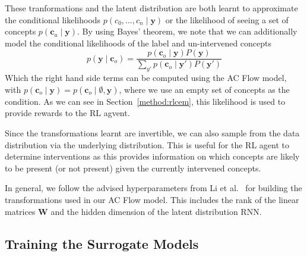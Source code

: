 These tranformations and the latent distribution are both learnt to
approximate the conditional likelihoods $p(c_0, \ldots, c_n \mid \mathbf{y})$
or the likelihood of seeing a set of concepts $p(\mathbf{c}_u \mid \mathbf{y})$.
By using Bayes' theorem, we note that
we can additionally model the conditional likelihoods of the label and un-intervened
concepts
\begin{equation}\label{equation:bayes}
p(\mathbf{y} \mid \mathbf{c}_o ) = \frac{
p( \mathbf{c}_o \mid \mathbf{y}) P(\mathbf{y})}
{\sum_{y'} p( \mathbf{c}_o \mid \mathbf{y}')P(\mathbf{y}')}
\end{equation}
Which the right hand side terms can be computed using the AC Flow model, with
$p(\mathbf{c}_o \mid \mathbf{y}) = p(\mathbf{c}_o \mid \emptyset, \mathbf{y})$, where we 
use an empty set of concepts as the condition.
As we can see in Section~\ref{method:rlcem}, this likelihood is used to 
provide rewards to the RL agvent.

Since the transformations learnt are invertible,
we can also sample from the data distribution
via the underlying distribution.
This is useful for the RL agent to
determine interventions as
this provides information on which concepts are likely to be present 
(or not present) given the currently intervened
concepts.

In general, we follow the advised hyperparameters from Li et al.~\cite{acflow}
for building the transformations used in our AC Flow model. This includes the rank of the linear
matrices $\mathbf{W}$ and the hidden dimension of the latent distribution RNN. 

\subsection{Training the Surrogate Models}\label{method:training-surrogate-model}

